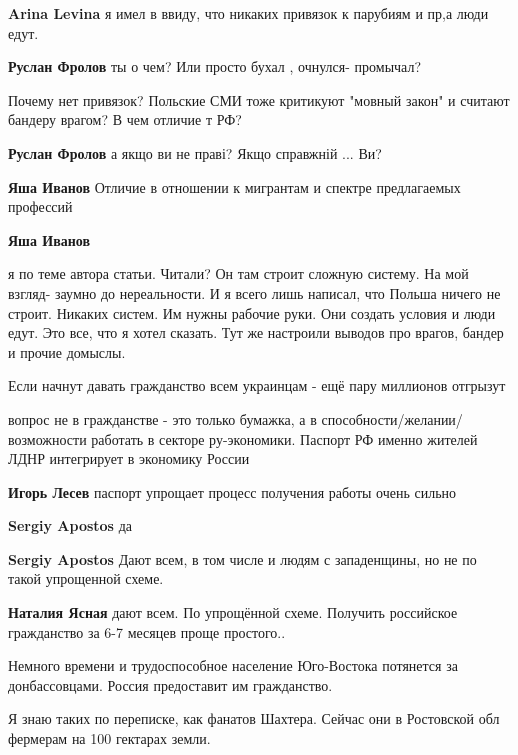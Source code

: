 \begin{itemize}
\begin{itemize}
\textbf{Arina Levina} я имел в ввиду, что никаких привязок к парубиям и пр,а люди едут.

\textbf{Руслан Фролов} ты о чем? Или просто бухал , очнулся- промычал?

Почему нет привязок? Польские СМИ тоже критикуют "мовный закон" и считают бандеру врагом? В чем отличие т РФ?

\textbf{Руслан Фролов} а якщо ви не праві? Якщо справжній ... Ви?

\textbf{Яша Иванов} Отличие в отношении к мигрантам и спектре предлагаемых профессий

\textbf{Яша Иванов} 

я по теме автора статьи. Читали? Он там строит сложную систему. На мой взгляд-
заумно до нереальности. И я всего лишь написал, что Польша ничего не строит.
Никаких систем. Им нужны рабочие руки. Они создать условия и люди едут. Это все,
что я хотел сказать. Тут же настроили выводов про врагов, бандер и прочие
домыслы.
\end{itemize} %

Если начнут давать гражданство всем украинцам - ещё пару миллионов отгрызут

\begin{itemize} %
вопрос не в гражданстве - это только бумажка, а в способности/желании/возможности работать в секторе ру-экономики. Паспорт РФ именно жителей ЛДНР интегрирует в экономику России

\textbf{Игорь Лесев} паспорт упрощает процесс получения работы очень сильно

\textbf{Sergiy Apostos} да

\textbf{Sergiy Apostos} Дают всем, в том числе и людям с западенщины, но не по такой упрощенной схеме.

\textbf{Наталия Ясная} дают всем. По упрощённой схеме. Получить российское гражданство за 6-7 месяцев проще простого..
\end{itemize} %

Немного времени и трудоспособное население Юго-Востока потянется за донбассовцами. Россия предоставит им гражданство.

Я знаю таких по переписке, как фанатов Шахтера.
Сейчас они в Ростовской обл фермерам на 100 гектарах земли.


\end{itemize}
